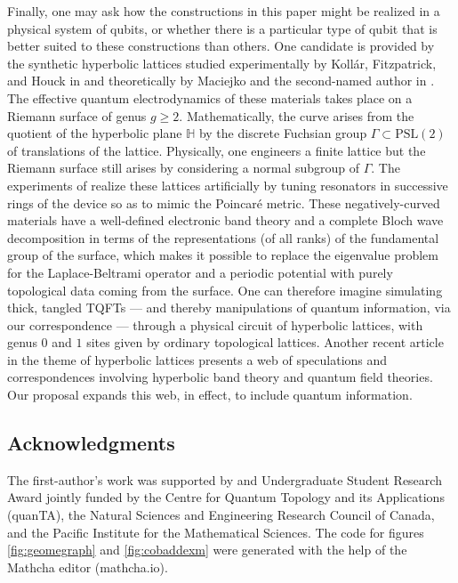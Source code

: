 \documentclass{amsart}
\numberwithin{thm}{section}
\theoremstyle{definition}
\begin{document}
Finally, one may ask how the constructions in this paper might be realized in a physical system of qubits, or whether there is a particular type of qubit that is better suited to these constructions than others.  One candidate is provided by the synthetic hyperbolic lattices studied experimentally by Koll\'ar, Fitzpatrick, and Houck in \cite{KFH} and theoretically by Maciejko and the second-named author in \cite{MR1}.  The effective quantum electrodynamics of these materials takes place on a Riemann surface of genus $g\geq2$.  Mathematically, the curve arises from the quotient of the hyperbolic plane $\mathbb H$ by the discrete Fuchsian group $\Gamma\subset\mbox{PSL}(2)$ of translations of the lattice.  Physically, one engineers a finite lattice but the Riemann surface still arises by considering a normal subgroup of $\Gamma$.  The experiments of \cite{KFH} realize these lattices artificially by tuning resonators in successive rings of the device so as to mimic the Poincar\'e metric. These negatively-curved materials have a well-defined electronic band theory \cite{MR1} and a complete Bloch wave decomposition \cite{MR2} in terms of the representations (of all ranks) of the fundamental group of the surface, which makes it possible to replace the eigenvalue problem for the Laplace-Beltrami operator and a periodic potential with purely topological data coming from the surface.  One can therefore imagine simulating thick, tangled TQFTs --- and thereby manipulations of quantum information, via our correspondence --- through a physical circuit of hyperbolic lattices, with genus $0$ and $1$ sites given by ordinary topological lattices.  Another recent article \cite{KR} in the theme of hyperbolic lattices presents a web of speculations and correspondences involving hyperbolic band theory and quantum field theories.  Our proposal expands this web, in effect, to include quantum information.

\subsection*{Acknowledgments}

The first-author's work was supported by and Undergraduate Student Research
Award jointly funded by the Centre for Quantum Topology and its Applications
(quanTA), the Natural Sciences and Engineering Research Council of Canada, and
the Pacific Institute for the Mathematical Sciences. The code for figures
\ref{fig:geomegraph} and \ref{fig:cobaddexm} were generated with the help
of the Mathcha editor (mathcha.io).

%

\pagebreak


{}

\end{document}
